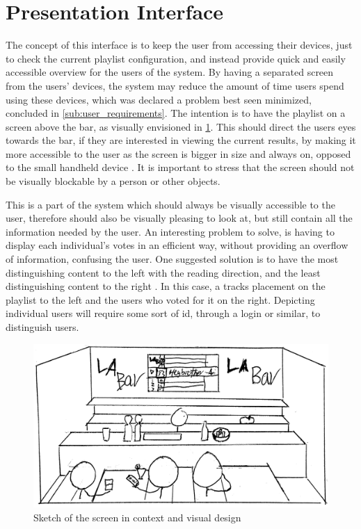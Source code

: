 \section{Presentation Interface}

The concept of this interface is to keep the user from accessing their devices, just to check the current playlist configuration, and instead provide quick and easily accessible overview for the users of the system. By having a separated screen from the users' devices, the system may reduce the amount of time users spend using these devices, which was declared a problem best seen minimized, concluded in \cref{sub:user_requirements}. The intention is to have the playlist on a screen above the bar, as visually envisioned in \cref{fig:PresentationInterface}. This should direct the users eyes towards the bar, if they are interested in viewing the current results, by making it more accessible to the user as the screen is bigger in size and always on, opposed to the small handheld device \cite{DEB} . It is important to stress that the screen should not be visually blockable by a person or other objects.

This is a part of the system which should always be visually accessible to the user, therefore should also be visually pleasing to look at, but still contain all the information needed by the user. An interesting problem to solve, is having to display each individual's votes in an efficient way, without providing an overflow of information, confusing the user. One suggested solution is to have the most distinguishing content to the left with the reading direction, and the least distinguishing content to the right \cite{material}. In this case, a tracks placement on the playlist to the left and the users who voted for it on the right. Depicting individual users will require some sort of id, through a login or similar, to distinguish users.

\begin{figure}[hbtp]
  \centering
  \includegraphics[width=1.0\linewidth]{Images/presentation.png}
  \caption{Sketch of the screen in context and visual design}\label{fig:PresentationInterface}
\end{figure}

